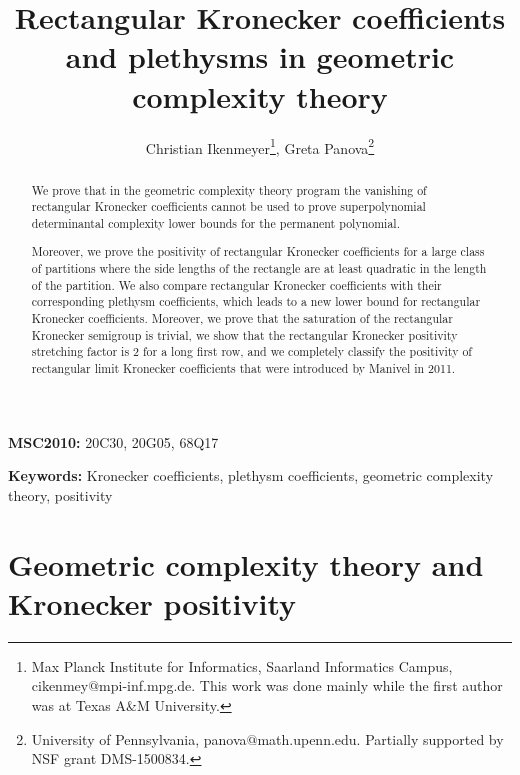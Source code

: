 \documentclass{article}
\title{Rectangular Kronecker coefficients and plethysms in geometric complexity theory}
\author{Christian Ikenmeyer\footnote{Max Planck Institute for Informatics, Saarland Informatics Campus, cikenmey$@$mpi-inf.mpg.de. This work was done mainly while the first author was at Texas A\&M University.}, Greta Panova\footnote{University of Pennsylvania, panova$@$math.upenn.edu. Partially supported by NSF grant DMS-1500834.}}
\numberwithin{equation}{section}
\theoremstyle{definition}
\begin{document}
\sloppy
\maketitle

\begin{abstract}
We prove that in the geometric complexity theory program
the vanishing of rectangular Kronecker coefficients cannot be used to
prove superpolynomial determinantal complexity lower bounds for the permanent polynomial.

Moreover, we prove the positivity of rectangular Kronecker coefficients for a large class of partitions
where the side lengths of the rectangle are at least quadratic in the length of the partition.
We also compare rectangular Kronecker coefficients with their corresponding plethysm coefficients,
which leads to a new lower bound for rectangular Kronecker coefficients.
Moreover, we prove that the saturation of the rectangular Kronecker semigroup is trivial,
we show that the rectangular Kronecker positivity stretching factor is 2 for a long first row,
and we completely classify the positivity of
rectangular limit Kronecker coefficients that were introduced by Manivel in 2011.
\end{abstract}

{\footnotesize\noindent\textbf{MSC2010:} 20C30, 20G05, 68Q17}

{\footnotesize\noindent\textbf{Keywords:} Kronecker coefficients, plethysm coefficients, geometric complexity theory, positivity}

\setcounter{tocdepth}{1}
\tableofcontents


\section{Geometric complexity theory and Kronecker positivity}
\end{document}
